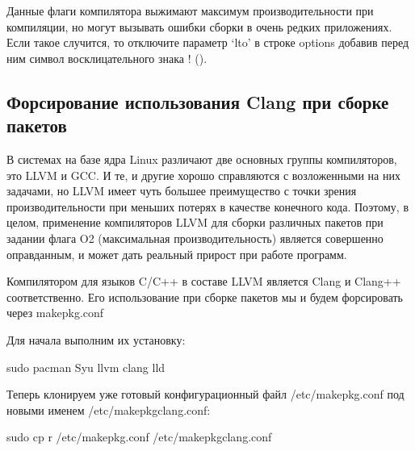 \documentclass[letterpaper,10pt,russian,openany]{sphinxmanual}
\begin{document}
\sphinxAtStartPar
Данные флаги компилятора выжимают максимум производительности при компиляции, но могут вызывать ошибки сборки в очень редких приложениях.
Если такое случится, то отключите параметр ‘lto’ в строке options добавив перед ним символ восклицательного знака  ! ().

\ignorespaces 

\subsection{Форсирование использования Clang при сборке пакетов}
\label{\detokenize{source/generic-system-acceleration:clang}}\label{\detokenize{source/generic-system-acceleration:force-clang-usage}}\label{\detokenize{source/generic-system-acceleration:index-1}}
\sphinxAtStartPar
В системах на базе ядра Linux различают две основных группы компиляторов, это LLVM и GCC.
И те, и другие хорошо справляются с возложенными на них задачами,
но LLVM имеет чуть большее преимущество с точки зрения производительности при меньших потерях в качестве конечного кода.
Поэтому, в целом, применение компиляторов LLVM для сборки различных пакетов при задании флага \sphinxhyphen{}O2
(максимальная производительность) является совершенно оправданным, и может дать реальный прирост при работе программ.

\sphinxAtStartPar
Компилятором для языков C/C++ в составе LLVM является Clang и Clang++ соответственно.
Его использование при сборке пакетов мы и будем форсировать через makepkg.conf

\sphinxAtStartPar
Для начала выполним их установку:

\begin{sphinxVerbatim}[commandchars=\\\{\}]
sudo pacman \PYGZhy{}Syu llvm clang lld
\end{sphinxVerbatim}

\sphinxAtStartPar
Теперь клонируем уже готовый конфигурационный файл /etc/makepkg.conf под новыми именем /etc/makepkg\sphinxhyphen{}clang.conf:

\begin{sphinxVerbatim}[commandchars=\\\{\}]
sudo cp \PYGZhy{}r /etc/makepkg.conf /etc/makepkg\PYGZhy{}clang.conf
\end{sphinxVerbatim}
\end{document}
